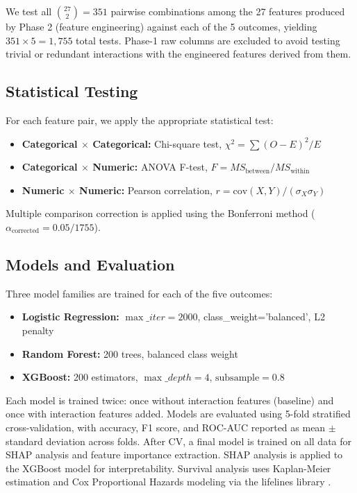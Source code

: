 \documentclass[twocolumn]{article}
\begin{document}
We test all $\binom{27}{2} = 351$ pairwise combinations among the 27 features produced by Phase 2 (feature engineering) against each of the 5 outcomes, yielding $351 \times 5 = 1{,}755$ total tests. Phase-1 raw columns are excluded to avoid testing trivial or redundant interactions with the engineered features derived from them.

\subsection{Statistical Testing}

For each feature pair, we apply the appropriate statistical test:

\begin{itemize}
    \item \textbf{Categorical $\times$ Categorical:} Chi-square test, $\chi^2 = \sum (O - E)^2 / E$
    \item \textbf{Categorical $\times$ Numeric:} ANOVA F-test, $F = MS_{\text{between}} / MS_{\text{within}}$
    \item \textbf{Numeric $\times$ Numeric:} Pearson correlation, $r = \text{cov}(X,Y) / (\sigma_X \sigma_Y)$
\end{itemize}

Multiple comparison correction is applied using the Bonferroni method ($\alpha_{\text{corrected}} = 0.05 / 1755$).

\subsection{Models and Evaluation}

Three model families are trained for each of the five outcomes:

\begin{itemize}
    \item \textbf{Logistic Regression:} $\max\_iter=2000$, class\_weight='balanced', L2 penalty
    \item \textbf{Random Forest:} 200 trees, balanced class weight
    \item \textbf{XGBoost:} 200 estimators, $\max\_depth=4$, $\text{subsample}=0.8$
\end{itemize}

Each model is trained twice: once without interaction features (baseline) and once with interaction features added. Models are evaluated using 5-fold stratified cross-validation, with accuracy, F1 score, and ROC-AUC reported as mean $\pm$ standard deviation across folds. After CV, a final model is trained on all data for SHAP analysis and feature importance extraction. SHAP analysis \cite{lundberg2017unified} is applied to the XGBoost model for interpretability. Survival analysis uses Kaplan-Meier estimation and Cox Proportional Hazards modeling via the lifelines library \cite{davidson2019lifelines}.
\end{document}
